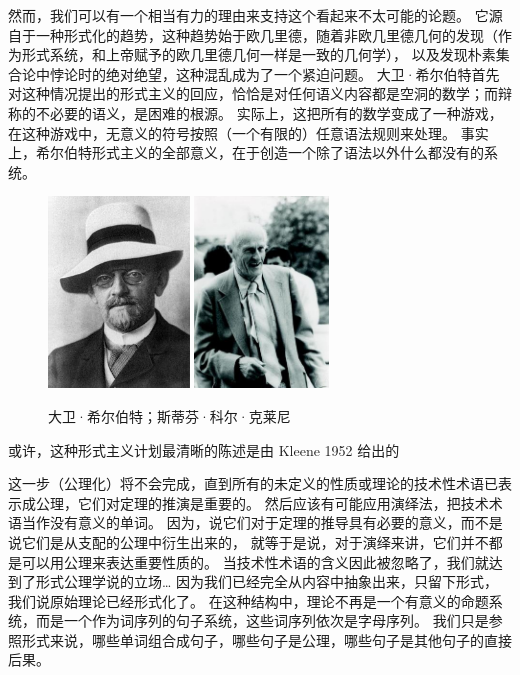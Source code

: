\documentclass[a4paper,12pt]{article}
\begin{document}
然而，我们可以有一个相当有力的理由来支持这个看起来不太可能的论题。
它源自于一种形式化的趋势，这种趋势始于欧几里德，随着非欧几里德几何的发现（作为形式系统，和上帝赋予的欧几里德几何一样是一致的几何学），
以及发现朴素集合论中悖论时的绝对绝望，这种混乱成为了一个紧迫问题。
大卫·希尔伯特首先对这种情况提出的形式主义的回应，恰恰是对任何语义内容都是空洞的数学；而辩称的不必要的语义，是困难的根源。
实际上，这把所有的数学变成了一种游戏，在这种游戏中，无意义的符号按照（一个有限的）任意语法规则来处理。
事实上，希尔伯特形式主义的全部意义，在于创造一个除了语法以外什么都没有的系统。

\begin{figure}[ht]
\centering
\includegraphics[height=2.0in]{images/hilbert.jpg}
\includegraphics[height=2.0in]{images/kleene.jpg}
\caption{大卫·希尔伯特；斯蒂芬·科尔·克莱尼}
\end{figure}

或许，这种形式主义计划最清晰的陈述是由 Kleene 1952 给出的

\begin{displayquote}
这一步（公理化）将不会完成，直到所有的未定义的性质或理论的技术性术语已表示成公理，它们对定理的推演是重要的。
然后应该有可能应用演绎法，把技术术语当作没有意义的单词。
因为，说它们对于定理的推导具有必要的意义，而不是说它们是从支配的公理中衍生出来的，
就等于是说，对于演绎来讲，它们并不都是可以用公理来表达重要性质的。
当技术性术语的含义因此被忽略了，我们就达到了形式公理学说的立场\ldots
因为我们已经完全从内容中抽象出来，只留下形式，我们说原始理论已经形式化了。
在这种结构中，理论不再是一个有意义的命题系统，而是一个作为词序列的句子系统，这些词序列依次是字母序列。
我们只是参照形式来说，哪些单词组合成句子，哪些句子是公理，哪些句子是其他句子的直接后果。
\end{displayquote}
\end{document}
